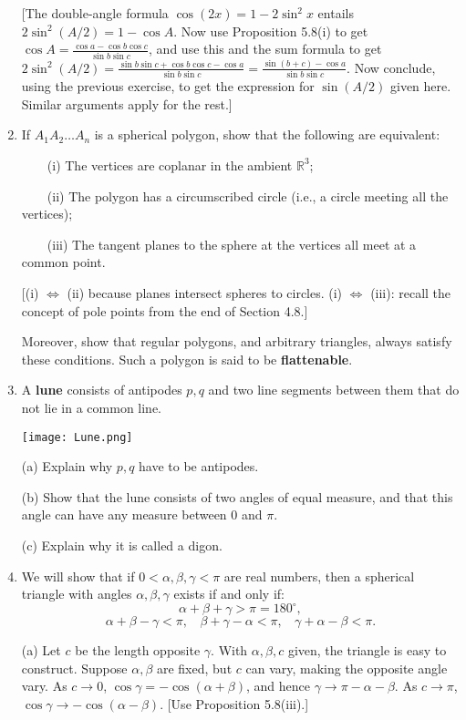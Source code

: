 \documentclass[leqno]{book}
\begin{document}
\begin{enumerate}
[The double-angle formula $\cos(2x)=1-2\sin^2x$ entails $2\sin^2(A/2)=1-\cos A$.  Now use Proposition 5.8(i) to get $\cos A=\frac{\cos a-\cos b\cos c}{\sin b\sin c}$, and use this and the sum formula to get $2\sin^2(A/2)=\frac{\sin b\sin c+\cos b\cos c-\cos a}{\sin b\sin c}=\frac{\sin(b+c)-\cos a}{\sin b\sin c}$.  Now conclude, using the previous exercise, to get the expression for $\sin(A/2)$ given here.  Similar arguments apply for the rest.]

\item If $A_1A_2\dots A_n$ is a spherical polygon, show that the following are equivalent:

~~~~(i) The vertices are coplanar in the ambient $\mathbb R^3$;

~~~~(ii) The polygon has a circumscribed circle (i.e., a circle meeting all the vertices);

~~~~(iii) The tangent planes to the sphere at the vertices all meet at a common point.

[(i) $\iff$ (ii) because planes intersect spheres to circles.  (i) $\iff$ (iii): recall the concept of pole points from the end of Section 4.8.]

Moreover, show that regular polygons, and arbitrary triangles, always satisfy these conditions.  Such a polygon is said to be \textbf{flattenable}.

\item A \textbf{lune} consists of antipodes $p,q$ and two line segments between them that do not lie in a common line.
\begin{center}
\texttt{[image: Lune.png]}
\end{center}
(a) Explain why $p,q$ have to be antipodes.

(b) Show that the lune consists of two angles of equal measure, and that this angle can have any measure between $0$ and $\pi$.

(c) Explain why it is called a digon.

\item We will show that if $0<\alpha,\beta,\gamma<\pi$ are real numbers, then a spherical triangle with angles $\alpha,\beta,\gamma$ exists if and only if:
$$\alpha+\beta+\gamma>\pi=180^\circ,$$
$$\alpha+\beta-\gamma<\pi,~~~~\beta+\gamma-\alpha<\pi,~~~~\gamma+\alpha-\beta<\pi.$$

(a) Let $c$ be the length opposite $\gamma$.  With $\alpha,\beta,c$ given, the triangle is easy to construct.  Suppose $\alpha,\beta$ are fixed, but $c$ can vary, making the opposite angle vary.  As $c\to 0$, $\cos\gamma=-\cos(\alpha+\beta)$, and hence $\gamma\to\pi-\alpha-\beta$.  As $c\to\pi$, $\cos\gamma\to-\cos(\alpha-\beta)$.  [Use Proposition 5.8(iii).]


\end{enumerate}
\end{document}

